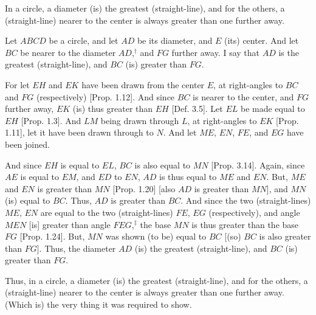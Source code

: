 \begin{Parallel}{}{}
{In a circle, a diameter (is) the greatest (straight-line), and for 
the others, a (straight-line) nearer to the center is always greater than one further away.

Let $ABCD$ be a circle, and let $AD$ be its diameter, and $E$ (its) center.
And let $BC$ be nearer to the diameter $AD$,$^\dag$ and $FG$ further away. I say that
$AD$ is the greatest (straight-line), and $BC$ (is) greater than $FG$.

For let $EH$ and $EK$ have been drawn from the center $E$, at right-angles
to $BC$ and $FG$ (respectively) [Prop. 1.12]. And since $BC$ is nearer to the center, and $FG$ further away, $EK$ (is) thus greater than $EH$ [Def. 3.5]. Let $EL$ be made equal to
$EH$ [Prop. 1.3]. And $LM$ being drawn through $L$, at right-angles to $EK$ [Prop. 1.11], 
let it have been drawn through to $N$. And let $ME$, $EN$, $FE$, and $EG$
have been joined.

And since $EH$ is equal to $EL$, $BC$ is also equal to $MN$ [Prop. 3.14]. Again,
since $AE$ is equal to $EM$, and $ED$ to $EN$, $AD$ is thus equal to $ME$ and $EN$.
But, $ME$ and $EN$ is greater than $MN$ [Prop. 1.20] [also $AD$ is greater than $MN$], and $MN$ (is) equal to $BC$. Thus, $AD$ is greater than $BC$. And since
the two (straight-lines) $ME$, $EN$ are equal to the two (straight-lines) $FE$, $EG$ (respectively),
and angle $MEN$ [is] greater than angle $FEG$,$^\ddag$ the base $MN$ is thus
greater than the base $FG$ [Prop. 1.24]. But, $MN$ was shown (to be) equal to $BC$ [(so) $BC$ is also greater than $FG$]. Thus, the diameter $AD$ (is) the
greatest (straight-line), and $BC$ (is) greater than $FG$.

\epsfysize=2.2in
\centerline{}

Thus, in a circle, a diameter (is) the greatest (straight-line), and for 
the others, a (straight-line) nearer to the center is always greater than one further away. (Which is) the very thing it was required to show.}
\end{Parallel}


\vspace{7pt}{\footnotesize \noindent$^\dag$ Euclid should have said ``to the center'', rather than "to the diameter $AD$", since $BC$, $AD$ and $FG$ are not necessarily parallel.\\
$^\ddag$  This is not proved,
except by reference to the figure.}

